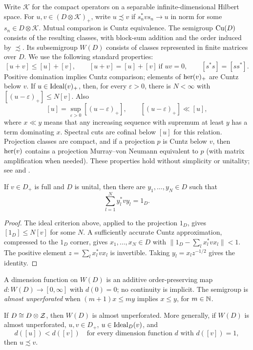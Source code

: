 Write $\mathcal K$ for the compact operators on a separable infinite-dimensional
Hilbert space. For $u,v\in(D\otimes\mathcal K)_+$, write $u\precsim v$ if
$s_n^*vs_n\to u$ in norm for some $s_n\in D\otimes\mathcal K$.
Mutual comparison is Cuntz equivalence.  The semigroup $\mathrm{Cu}(D)$ consists
of the resulting classes, with block-sum addition and the order induced
by $\precsim$.  Its subsemigroup $W(D)$ consists of classes represented
in finite matrices over $D$.  We use the following standard properties:
\[
 [u+v]\le[u]+[v],\qquad
 [u+v]=[u]+[v]\ \text{if }uv=0,\qquad
 [s^*s]=[ss^*].
\]
Positive domination implies Cuntz comparison; elements of $\operatorname{her}(v)_+$
are Cuntz below $v$.  If $u\in\operatorname{Ideal}(v)_+$, then, for every
$\varepsilon>0$, there is $N<\infty$ with
$[(u-\varepsilon)_+]\le N[v]$.  Also
\[
 [u]=\sup_{\varepsilon>0}[(u-\varepsilon)_+],
 \qquad [(u-\varepsilon)_+]\ll[u],
\]
where $x\ll y$ means that any increasing sequence with supremum at
least $y$ has a term dominating $x$.  Spectral cuts are cofinal below
$[u]$ for this relation.  Projection classes are compact, and if a
projection $p$ is Cuntz below $v$, then $\operatorname{her}(v)$ contains a projection
Murray--von Neumann equivalent to $p$ (with matrix amplification when
needed).  These properties hold without simplicity or unitality; see
\cite[Section~4]{Rordam} and \cite[Sections~2 and~4]{ERS}.

\begin{lemma}
\label{prelim:full-compressions}
If $v\in D_+$ is full and $D$ is unital, then there are
$y_1,\ldots,y_N\in D$ such that
\[
 \sum_{l=1}^N y_l^*vy_l=1_D.
\]
\end{lemma}

\begin{proof}
The ideal criterion above, applied to the projection $1_D$, gives
$[1_D]\le N[v]$ for some $N$.  A sufficiently accurate Cuntz
approximation, compressed to the $1_D$ corner, gives
$x_1,\ldots,x_N\in D$ with
$\|1_D-\sum_lx_l^*vx_l\|<1$.  The positive element
$z=\sum_lx_l^*vx_l$ is invertible.  Taking $y_l=x_lz^{-1/2}$
gives the identity.
\end{proof}

A dimension function on $W(D)$ is an additive order-preserving map
$d:W(D)\to[0,\infty]$ with $d(0)=0$; no continuity is implicit.
The semigroup is \emph{almost unperforated} when
$(m+1)x\le my$ implies $x\le y$, for $m\in\mathbb N$.

\begin{theorem}
\label{prelim:comparison}
If $D\cong D\otimes\mathcal Z$, then $W(D)$ is almost unperforated.
More generally, if $W(D)$ is almost unperforated, $u,v\in D_+$,
$u\in\operatorname{Ideal}_D(v)$, and
\[
 d([u])<d([v])\quad\text{for every dimension function $d$ with }d([v])=1,
\]
then $u\precsim v$.
\end{theorem}

